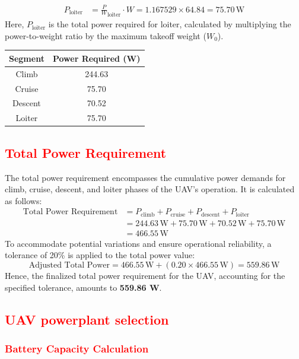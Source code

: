 \documentclass[12 pt]{article}
\begin{document}
\begin{align*}
P_{\text{loiter}} &= \frac{P}{W}_{\text{loiter}} \cdot W = 1.167529 \times 64.84 = 75.70 \, \text{W} \tag{3.31}
\end{align*}
Here, $P_{\text{loiter}}$ is the total power required for loiter, calculated by multiplying the power-to-weight ratio by the maximum takeoff weight ($W_0$).

\begin{center}
\begin{tabular}{|c|c|}
\hline
Segment & Power Required (W) \\
\hline
Climb & 244.63 \\
Cruise & 75.70 \\
Descent & 70.52 \\
Loiter & 75.70 \\
\hline
\end{tabular}
\end{center}

\subsection{\textcolor{red}{Total Power Requirement}}
The total power requirement encompasses the cumulative power demands for climb, cruise, descent, and loiter phases of the UAV's operation. It is calculated as follows:
\begin{align*}
\text{Total Power Requirement} &= P_{\text{climb}} + P_{\text{cruise}} + P_{\text{descent}} + P_{\text{loiter}} \tag{3.32}\\
&= 244.63 \, \text{W} + 75.70 \, \text{W} + 70.52 \, \text{W} + 75.70 \, \text{W} \\
&= 466.55 \, \text{W}
\end{align*}
To accommodate potential variations and ensure operational reliability, a tolerance of 20\% is applied to the total power value:
\[
\text{Adjusted Total Power} = 466.55 \, \text{W} + (0.20 \times 466.55 \, \text{W}) = 559.86 \, \text{W}
\tag{3.33}\]
Hence, the finalized total power requirement for the UAV, accounting for the specified tolerance, amounts to \textbf{559.86 W}.

\subsection{\textcolor{red}{UAV powerplant selection}}

\subsubsection{\textcolor{red}{Battery Capacity Calculation}}
\end{document}
